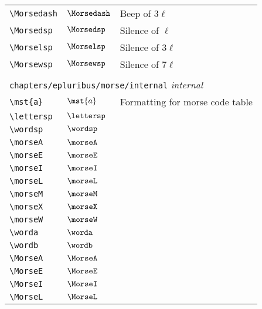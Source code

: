 \begin{longtable}{lll}
 {\color[rgb]{0.5,0.5,0.5}\texttt{\textbackslash Morsedash}} & $\Morsedash$ &  Beep of $3\ell$\\ 
 {\color[rgb]{0.5,0.5,0.5}\texttt{\textbackslash Morsedsp}} & $\Morsedsp$ &  Silence of $\ell$\\ 
 {\color[rgb]{0.5,0.5,0.5}\texttt{\textbackslash Morselsp}} & $\Morselsp$ &  Silence of $3\ell$\\ 
 {\color[rgb]{0.5,0.5,0.5}\texttt{\textbackslash Morsewsp}} & $\Morsewsp$ &  Silence of $7\ell$\\ 
  &  & \\ 
 \multicolumn{3}{l}{{\color[rgb]{0.5,0.5,0.5}\texttt{chapters/epluribus/morse/internal}} \emph{internal}}\\ 
 \hline
{\color[rgb]{0.5,0.5,0.5}\texttt{\textbackslash mst\{a\}}} & $\mst{a}$ &  Formatting for morse code table\\ 
 {\color[rgb]{0.5,0.5,0.5}\texttt{\textbackslash lettersp}} & $\lettersp$ & \\ 
 {\color[rgb]{0.5,0.5,0.5}\texttt{\textbackslash wordsp}} & $\wordsp$ & \\ 
 {\color[rgb]{0.5,0.5,0.5}\texttt{\textbackslash morseA}} & $\morseA$ & \\ 
 {\color[rgb]{0.5,0.5,0.5}\texttt{\textbackslash morseE}} & $\morseE$ & \\ 
 {\color[rgb]{0.5,0.5,0.5}\texttt{\textbackslash morseI}} & $\morseI$ & \\ 
 {\color[rgb]{0.5,0.5,0.5}\texttt{\textbackslash morseL}} & $\morseL$ & \\ 
 {\color[rgb]{0.5,0.5,0.5}\texttt{\textbackslash morseM}} & $\morseM$ & \\ 
 {\color[rgb]{0.5,0.5,0.5}\texttt{\textbackslash morseX}} & $\morseX$ & \\ 
 {\color[rgb]{0.5,0.5,0.5}\texttt{\textbackslash morseW}} & $\morseW$ & \\ 
 {\color[rgb]{0.5,0.5,0.5}\texttt{\textbackslash worda}} & $\worda$ & \\ 
 {\color[rgb]{0.5,0.5,0.5}\texttt{\textbackslash wordb}} & $\wordb$ & \\ 
 {\color[rgb]{0.5,0.5,0.5}\texttt{\textbackslash MorseA}} & $\MorseA$ & \\ 
 {\color[rgb]{0.5,0.5,0.5}\texttt{\textbackslash MorseE}} & $\MorseE$ & \\ 
 {\color[rgb]{0.5,0.5,0.5}\texttt{\textbackslash MorseI}} & $\MorseI$ & \\ 
 {\color[rgb]{0.5,0.5,0.5}\texttt{\textbackslash MorseL}} & $\MorseL$ & \\ 

\end{longtable}

